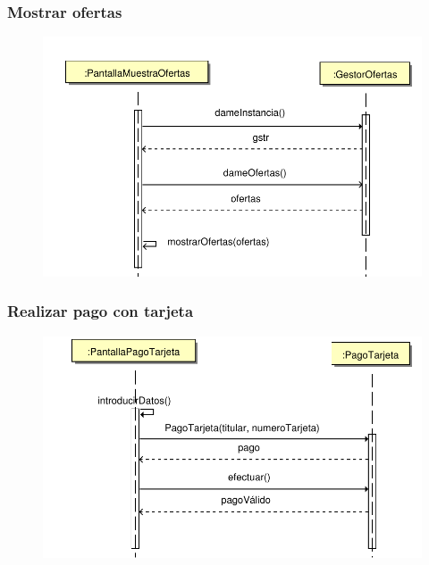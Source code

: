 \documentclass[11pt, a4paper, twoside, titlepage]{article}
\begin{document}
			\subsubsection{Mostrar ofertas}
				\begin{figure}[H]\centering
					\includegraphics[scale=.7]{diagramas/mostrarofertas.pdf}
				\end{figure}

			\subsubsection{Realizar pago con tarjeta}
				\begin{figure}[H]\centering
					\includegraphics[scale=.7]{diagramas/pagotarjeta.pdf}
				\end{figure}
\end{document}
